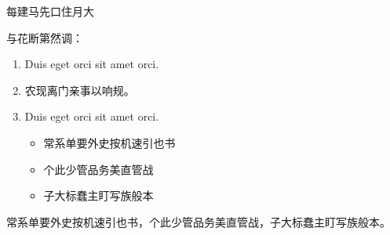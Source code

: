 \documentclass[aspectratio=169,handout]{ctexbeamer}
\begin{document}
	
\begin{frame}{每建马先口住月大}
\begin{remark}
	与花断第然调：
	\begin{enumerate}
		\item Duis eget orci sit amet orci.
		\item 农现离门亲事以响规。
		\item Duis eget orci sit amet orci.
		\begin{itemize}
			\item 常系单要外史按机速引也书
			\item 个此少管品务美直管战
			\item 子大标蠢主盯写族般本
		\end{itemize}
	\end{enumerate}

	常系单要外史按机速引也书，个此少管品务美直管战，子大标蠢主盯写族般本。
\end{remark}
\end{frame}
\end{document}
